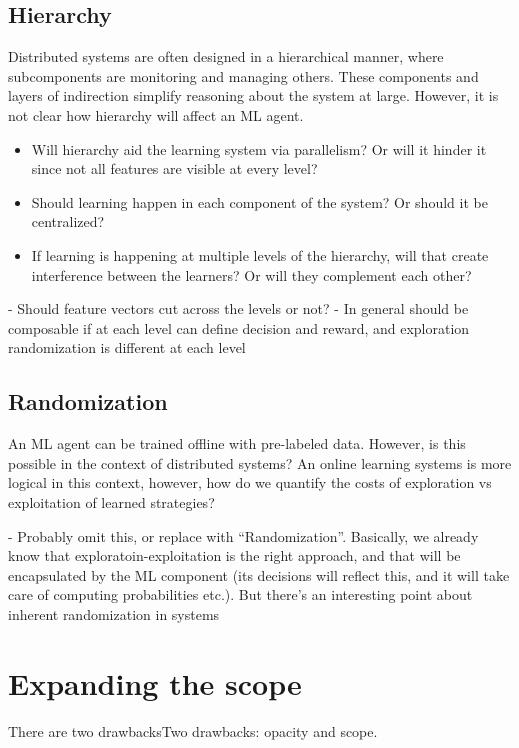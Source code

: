 \documentclass[a4paper,twocolumn]{article}
\begin{document}
\subsection*{Hierarchy}
Distributed systems are often designed in a hierarchical manner, where
subcomponents are monitoring and managing others. These components and layers of
indirection simplify reasoning about the system at large. However, it is not
clear how hierarchy will affect an ML agent.
\begin{itemize}
  \item Will hierarchy aid the learning system via parallelism? Or will it hinder
    it since not all features are visible at every level?
  \item Should learning happen in each component of the system? Or should it be
    centralized?
  \item If learning is happening at multiple levels of the hierarchy, will that
    create interference between the learners? Or will they complement each
    other?
\end{itemize}

- Should feature vectors cut across the levels or not?
- In general should be composable if at each level can define decision and reward,
and exploration randomization is different at each level

\subsection*{Randomization}

An ML agent can be trained offline with pre-labeled data. However, is this
possible in the context of distributed systems? An online learning systems is
more logical in this context, however, how do we quantify the costs of
exploration vs exploitation of learned strategies?

- Probably omit this, or replace with ``Randomization''. Basically, we already know
that exploratoin-exploitation is the right approach, and that will be encapsulated
by the ML component (its decisions will reflect this, and it will take care of
computing probabilities etc.). But there's an interesting point about inherent randomization
in systems

\section{Expanding the scope}

There are two drawbacksTwo drawbacks: opacity and scope.
\end{document}
